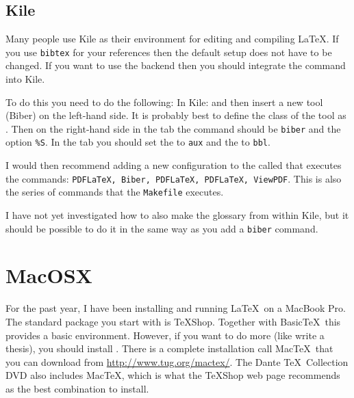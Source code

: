 \subsection{Kile}
\label{sec:app:kubuntu:kile}

Many people use Kile as their environment for editing and compiling
\LaTeX. If you use \texttt{bibtex} for your references then the default
setup does not have to be changed. If you want to use the
 backend then you should integrate the
command into Kile.

To do this you need to do the following:
In Kile:  and
then insert a new tool (Biber) on the left-hand side. It is probably
best to define the class of the tool as \BibTeX. Then on the
right-hand side in the  tab the command should be
\texttt{biber} and the option \texttt{\%S}. In the 
tab you should set the  to \texttt{aux} and
the  to \texttt{bbl}.

I would then recommend adding a new configuration to the
 called  that
executes the commands: \texttt{PDFLaTeX, Biber, PDFLaTeX, PDFLaTeX,
  ViewPDF}. This is also the series of commands that the
\texttt{Makefile} executes.

I have not yet investigated how to also make the glossary from within
Kile, but it should be possible to do it in the same way as you add a
\texttt{biber} command.


\section{MacOSX}
\label{sec:app:mac}

For the past year, I have been installing and running \LaTeX\ on a MacBook Pro.
The standard package you start with is \TeX Shop. 
Together with Basic\TeX\ this provides a basic environment. 
However, if you want to do more (like write a thesis),
you should install \TeXLive.
There is a complete \TeXLive installation call Mac\TeX\ 
that you can download from \url{http://www.tug.org/mactex/}.
The Dante \TeX\ Collection DVD also includes Mac\TeX, which is what the \TeX Shop web page
recommends as the best combination to install.

